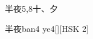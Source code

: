 \begin{entry}{半夜}{5,8}{⼗、⼣}
  \begin{phonetics}{半夜}{ban4 ye4}[][HSK 2]
  \end{phonetics}
\end{entry}

